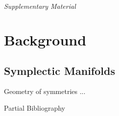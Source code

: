 \documentclass[beamer,10pt]{standalone}
\begin{document}


\begin{frame}
	\begin{center}
	\Huge\emph{Supplementary Material}
	\end{center}
\end{frame}
\note[itemize]{
	\item
}
\addtocounter{framenumber}{-1}





\section{Background}



\subsection{Symplectic Manifolds}


\begin{frame}{Geometry of symmetries}\label{frame:geometrysymmetries}
	...		
\end{frame}
\note[itemize]{
	\item
}


\ifstandalone
\begin{frame}[t,allowframebreaks]{Partial Bibliography}
	\nocite{Miti2021}
	
	
\end{frame}
\fi


\end{document}

